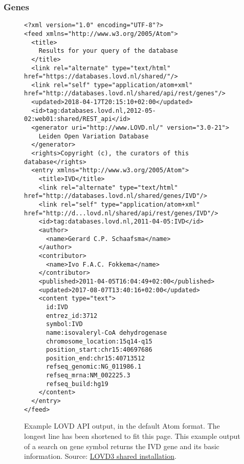 \subsubsection{Genes}
\begin{figure}[ht]
  \begin{shaded}
    \scriptsize
    \begin{verbatim}
<?xml version="1.0" encoding="UTF-8"?>
<feed xmlns="http://www.w3.org/2005/Atom">
  <title>
    Results for your query of the database
  </title>
  <link rel="alternate" type="text/html" href="https://databases.lovd.nl/shared/"/>
  <link rel="self" type="application/atom+xml" href="http://databases.lovd.nl/shared/api/rest/genes"/>
  <updated>2018-04-17T20:15:10+02:00</updated>
  <id>tag:databases.lovd.nl,2012-05-02:web01:shared/REST_api</id>
  <generator uri="http://www.LOVD.nl/" version="3.0-21">
    Leiden Open Variation Database
  </generator>
  <rights>Copyright (c), the curators of this database</rights>
  <entry xmlns="http://www.w3.org/2005/Atom">
    <title>IVD</title>
    <link rel="alternate" type="text/html" href="http://databases.lovd.nl/shared/genes/IVD"/>
    <link rel="self" type="application/atom+xml" href="http://d...lovd.nl/shared/api/rest/genes/IVD"/>
    <id>tag:databases.lovd.nl,2011-04-05:IVD</id>
    <author>
      <name>Gerard C.P. Schaafsma</name>
    </author>
    <contributor>
      <name>Ivo F.A.C. Fokkema</name>
    </contributor>
    <published>2011-04-05T16:04:49+02:00</published>
    <updated>2017-08-07T13:40:16+02:00</updated>
    <content type="text">
      id:IVD
      entrez_id:3712
      symbol:IVD
      name:isovaleryl-CoA dehydrogenase
      chromosome_location:15q14-q15
      position_start:chr15:40697686
      position_end:chr15:40713512
      refseq_genomic:NG_011986.1
      refseq_mrna:NM_002225.3
      refseq_build:hg19
    </content>
  </entry>
</feed>
    \end{verbatim}
  \caption{%
    Example LOVD API output, in the default Atom format.
    The longest line has been shortened to fit this page.
    This example output of a search on gene symbol returns the IVD gene and its basic information.
    Source: \href{https://databases.lovd.nl/shared/api/rest/genes?search_symbol=IVD}
     {LOVD3 shared installation}.}
  \end{shaded}
\end{figure}

